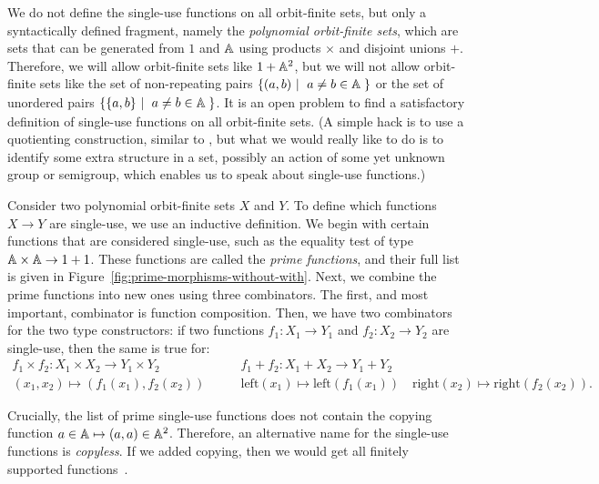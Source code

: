 \documentclass[a4paper,UKenglish,cleveref, autoref, numberwithinsect, thm-restate]{lipics-v2021}
\begin{document}
We do not define the single-use functions on all orbit-finite sets, but only a syntactically defined fragment, namely the \emph{polynomial orbit-finite sets}, which are sets that can be generated from $1$ and $\mathbb A$ using  
 products $\times$ and disjoint unions $+$. Therefore, we will allow orbit-finite sets like $1 + \mathbb A^2$, but we will not allow orbit-finite sets like 
the set of non-repeating pairs
$\setbuild{(a,b)}{$a \neq b \in \atoms$}$ or the set of unordered pairs $\setbuild{\set{a,b}}{$a \neq b \in \atoms$}$. It is an open problem to find a satisfactory definition of single-use functions on all orbit-finite sets. (A simple hack is to use a quotienting construction, similar to , but what we would really like to do is to identify some extra structure in a set, possibly an action of some yet unknown group or semigroup, which enables us to speak about single-use functions.)

Consider two polynomial orbit-finite sets $X$ and $Y$. To define which functions $X \to Y$ are single-use, we use an inductive definition. We begin with certain functions that are considered single-use, such as the equality test of type $\mathbb A \times \mathbb A \to 1 + 1$. These functions are called the \emph{prime functions}, and their full list is given in Figure~\ref{fig:prime-morphisms-without-with}. Next, we combine the prime functions into new ones using three combinators. The first, and most important, combinator is  function composition. Then, we have two combinators for the two type constructors: if two functions $f_1 : X_1 \to Y_1$ and $f_2 : X_2 \to Y_2$ are single-use, then the same is true for:
\begin{align*}
    f_1 \times f_2 : X_1 \times X_2 \to Y_1 \times Y_2
    \qquad &
    f_1 + f_2 : X_1 + X_2 \to Y_1 + Y_2 \\
    \scriptstyle  (x_1,x_2) \mapsto (f_1(x_1),f_2(x_2)) 
    \qquad &
    {\scriptstyle \text{left}(x_1) \mapsto \text{left}(f_1(x_1)) 
        \quad 
        \text{right}(x_2) \mapsto \text{right}(f_2(x_2)) }.
\end{align*}

Crucially, the list of prime single-use functions does not contain the copying function $a \in \mathbb A \mapsto (a,a) \in \mathbb A^2$. Therefore, an alternative name for the single-use functions is \emph{copyless}. If we added copying, then we would get all finitely supported functions~\cite[Lemma 23]{stefanski-phd}.
\end{document}
